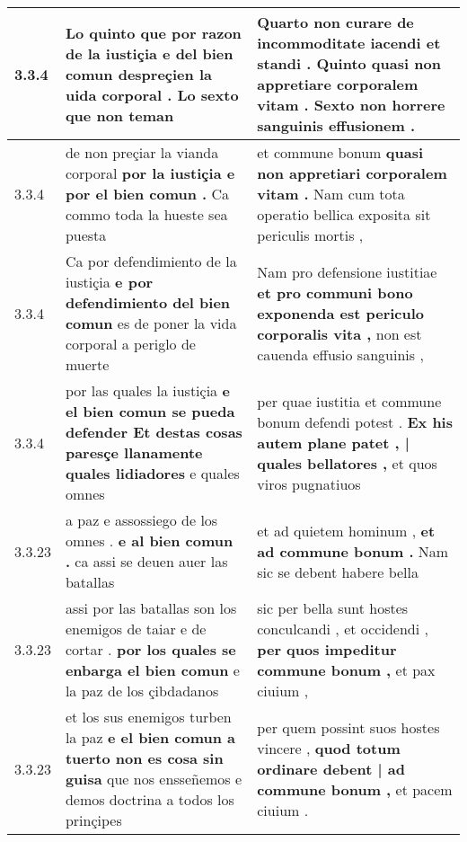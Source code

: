 \begin{tabular}{|p{1cm}|p{6.5cm}|p{6.5cm}|}
3.3.4 & Lo quinto \textbf{ que por razon de la iustiçia e del bien comun despreçien la uida corporal . } Lo sexto que non teman & Quarto non curare de incommoditate iacendi et standi . \textbf{ Quinto quasi non appretiare corporalem vitam . } Sexto non horrere sanguinis effusionem . \\\hline
3.3.4 & de non preçiar la vianda corporal \textbf{ por la iustiçia e por el bien comun . } Ca commo toda la hueste sea puesta & et commune bonum \textbf{ quasi non appretiari corporalem vitam . } Nam cum tota operatio bellica exposita sit periculis mortis , \\\hline
3.3.4 & Ca por defendimiento de la iustiçia \textbf{ e por defendimiento del bien comun } es de poner la vida corporal a periglo de muerte & Nam pro defensione iustitiae \textbf{ et pro communi bono exponenda est periculo corporalis vita , } non est cauenda effusio sanguinis , \\\hline
3.3.4 & por las quales la iustiçia \textbf{ e el bien comun se pueda defender Et destas cosas paresçe llanamente quales lidiadores } e quales omnes & per quae iustitia et commune bonum defendi potest . \textbf{ Ex his autem plane patet , | quales bellatores , } et quos viros pugnatiuos \\\hline
3.3.23 & a paz e assossiego de los omnes . \textbf{ e al bien comun . } ca assi se deuen auer las batallas & et ad quietem hominum , \textbf{ et ad commune bonum . } Nam sic se debent habere bella \\\hline
3.3.23 & assi por las batallas son los enemigos de taiar e de cortar . \textbf{ por los quales se enbarga el bien comun } e la paz de los çibdadanos & sic per bella sunt hostes conculcandi , et occidendi , \textbf{ per quos impeditur commune bonum , } et pax ciuium , \\\hline
3.3.23 & et los sus enemigos turben la paz \textbf{ e el bien comun a tuerto non es cosa sin guisa } que nos ensseñemos e demos doctrina a todos los prinçipes & per quem possint suos hostes vincere , \textbf{ quod totum ordinare debent | ad commune bonum , } et pacem ciuium . \\\hline

\end{tabular}
